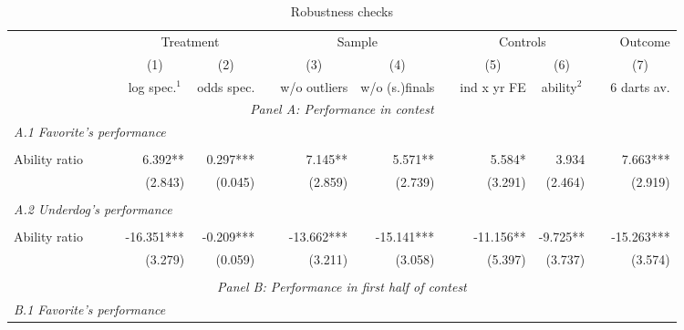 \documentclass[11pt,a4paper]{article}
\begin{document}
\begin{landscape}

	\begin{table}[H]
		\centering
		\caption{Robustness checks} 
		\label{apptab:table_rob_new}
		\begin{tabular}{l r r r r r r r r r r} 
			\toprule \toprule
            & \multicolumn{2}{c}{Treatment} & & \multicolumn{2}{c}{Sample} & & \multicolumn{2}{c}{Controls} & & Outcome \\
            \cline{2-3} \cline{5-6} \cline{8-9} \cline{11-11}
    \rule{0pt}{3ex}   
			& \multicolumn{1}{c}{(1)}        & \multicolumn{1}{c}{(2)} & & \multicolumn{1}{c}{(3)}   & \multicolumn{1}{c}{(4)} & & \multicolumn{1}{c}{(5)} & \multicolumn{1}{c}{(6)}  & & \multicolumn{1}{c}{(7)} \\
                      \rule{0pt}{3ex}
    		& \multicolumn{1}{c}{log spec.$^1$} & \multicolumn{1}{c}{odds spec.} & & \multicolumn{1}{c}{w/o outliers}   & \multicolumn{1}{c}{w/o (s.)finals} & & \multicolumn{1}{c}{ind x yr FE} & \multicolumn{1}{c}{ability$^2$}  & & \multicolumn{1}{c}{6 darts av.} \\
			\midrule
			\multicolumn{11}{c}{\textit{Panel A: Performance in contest}}      \\
			\multicolumn{11}{l}{\textit{A.1 Favorite's performance}}      \\
            \rule{0pt}{0.01ex}\\
			Ability ratio ~~~~ & 6.392**   & 0.297*** & & 7.145**  & 5.571**  & & 5.584*  & 3.934    & & 7.663***   \\
			                         & (2.843)   & (0.045)  & & (2.859)  & (2.739)  & & (3.291) & (2.464)  & & (2.919)  \\
            \rule{0pt}{0.3ex}\\
			\multicolumn{11}{l}{\textit{A.2 Underdog's performance}}  \\
            \rule{0pt}{0.01ex}\\
			Ability ratio            & -16.351*** & -0.209*** & & -13.662*** & -15.141*** & & -11.156** & -9.725**  & & -15.263***  \\
			                         & (3.279)    & (0.059)  & & (3.211)    & (3.058)   & & (5.397)   & (3.737)     & & (3.574)  \\
            \rule{0pt}{0.3ex}\\
			\midrule
   			\multicolumn{11}{c}{\textit{Panel B: Performance in first half of contest}}      \\
			\multicolumn{11}{l}{\textit{B.1 Favorite's performance}}      \\

\end{tabular}
\end{table}
\end{landscape}
\end{document}
